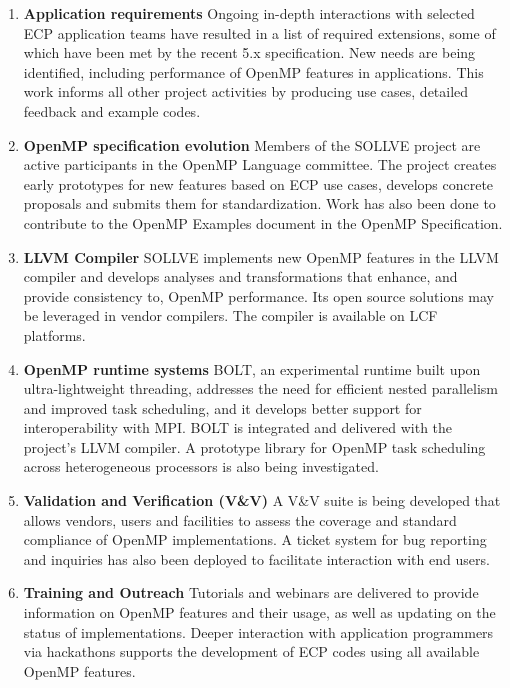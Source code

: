 \begin{enumerate}

\item {\bf Application requirements}
Ongoing in-depth interactions with selected ECP application teams have resulted in a list of required extensions, some of which have been met by the recent 5.x specification.  New needs are being identified, including performance of OpenMP features in applications. This work informs all other project activities by producing use cases, detailed feedback and example codes. 

\item {\bf OpenMP specification evolution}
Members of the SOLLVE project are active participants in the OpenMP Language committee. The project creates early prototypes for new features based on ECP use cases, develops concrete proposals and submits them for standardization. Work has also been done to contribute to the OpenMP Examples document in the OpenMP Specification. 

\item {\bf LLVM  Compiler}
SOLLVE implements new OpenMP features in the LLVM compiler and develops analyses and transformations that enhance, and provide consistency to, OpenMP performance. Its open source solutions may be leveraged in vendor compilers. The compiler is available on LCF platforms.

\item {\bf OpenMP runtime systems} 
BOLT, an experimental runtime built upon ultra-lightweight threading, addresses the need for efficient nested parallelism and improved task scheduling, and it develops better support for interoperability with MPI. BOLT is integrated and delivered with the project's LLVM compiler. A prototype library for OpenMP task scheduling across heterogeneous processors is also being investigated. 

\item {\bf Validation and Verification (V\&V)}
A V\&V suite is being developed that allows vendors, users and facilities to assess the coverage and standard compliance of OpenMP implementations. A ticket system for bug reporting and inquiries has also been deployed to facilitate interaction with end users.
\item{\bf Training and Outreach}
 Tutorials and webinars are delivered to provide information on OpenMP features and their usage, as well as updating on the status of 
 implementations. Deeper interaction with application programmers via hackathons supports the development of ECP codes using all available OpenMP features.
\end{enumerate}

